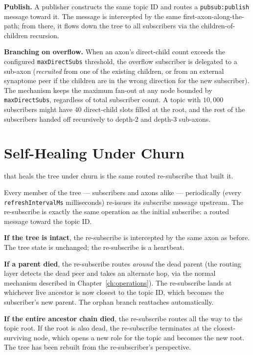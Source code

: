 \documentclass[twoside,nobib]{tufte-book}
\begin{document}
\textbf{Publish.} A publisher constructs the same topic ID and
routes a \texttt{pubsub:publish} message toward it. The message
is intercepted by the same first-axon-along-the-path; from there,
it flows down the tree to all subscribers via the children-of-children
recursion.

\textbf{Branching on overflow.} When an axon's direct-child count
exceeds the configured \texttt{maxDirectSubs} threshold, the
overflow subscriber is delegated to a sub-axon (\emph{recruited}
from one of the existing children, or from an external synaptome
peer if the children are in the wrong direction for the new
subscriber). The mechanism keeps the maximum fan-out at any node
bounded by \texttt{maxDirectSubs}, regardless of total subscriber
count. A topic with $10{,}000$ subscribers might have $40$
direct-child slots filled at the root, and the rest of the
subscribers handed off recursively to depth-2 and depth-3
sub-axons.

\section{Self-Healing Under Churn}

 that heals the tree under churn is the
same routed re-subscribe that built it.

Every member of the tree --- subscribers and axons alike ---
periodically (every \texttt{refreshIntervalMs} milliseconds)
re-issues its subscribe message upstream. The re-subscribe is
exactly the same operation as the initial subscribe: a routed
message toward the topic ID.

\textbf{If the tree is intact}, the re-subscribe is intercepted
by the same axon as before. The tree state is unchanged; the
re-subscribe is a heartbeat.

\textbf{If a parent died}, the re-subscribe routes \emph{around}
the dead parent (the routing layer detects the dead peer and
takes an alternate hop, via the normal mechanism described in
Chapter~\ref{ch:operations}). The re-subscribe lands at whichever
live ancestor is now closest to the topic ID, which becomes the
subscriber's new parent. The orphan branch reattaches automatically.

\textbf{If the entire ancestor chain died}, the re-subscribe
routes all the way to the topic root. If the root is also dead,
the re-subscribe terminates at the closest-surviving node, which
opens a new role for the topic and becomes the new root. The
tree has been rebuilt from the re-subscriber's perspective.
\end{document}
